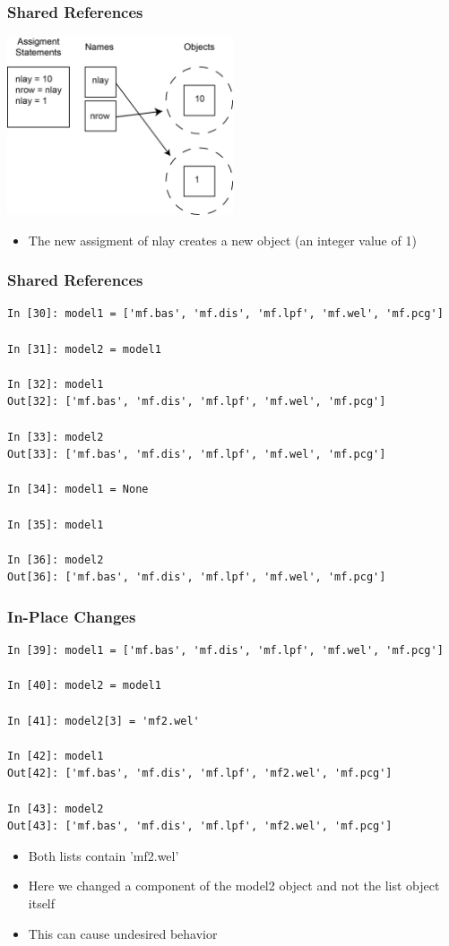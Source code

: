 \documentclass{beamer}
\begin{document}
\begin{frame}[fragile]
\frametitle{Shared References}
  \centering
    \includegraphics[width=0.5\textwidth]{figures/sharedref2.png} 
  \begin{itemize}
    \item{The new assigment of nlay creates a new object (an integer value of 1)}
  \end{itemize}
\end{frame}

\begin{frame}[fragile]
\frametitle{Shared References}
  \begin{lstlisting}
In [30]: model1 = ['mf.bas', 'mf.dis', 'mf.lpf', 'mf.wel', 'mf.pcg']

In [31]: model2 = model1

In [32]: model1
Out[32]: ['mf.bas', 'mf.dis', 'mf.lpf', 'mf.wel', 'mf.pcg']

In [33]: model2
Out[33]: ['mf.bas', 'mf.dis', 'mf.lpf', 'mf.wel', 'mf.pcg']

In [34]: model1 = None

In [35]: model1

In [36]: model2
Out[36]: ['mf.bas', 'mf.dis', 'mf.lpf', 'mf.wel', 'mf.pcg']
  \end{lstlisting}
\end{frame}

\begin{frame}[fragile]
\frametitle{In-Place Changes}
  \begin{lstlisting}
In [39]: model1 = ['mf.bas', 'mf.dis', 'mf.lpf', 'mf.wel', 'mf.pcg']

In [40]: model2 = model1

In [41]: model2[3] = 'mf2.wel'

In [42]: model1
Out[42]: ['mf.bas', 'mf.dis', 'mf.lpf', 'mf2.wel', 'mf.pcg']

In [43]: model2
Out[43]: ['mf.bas', 'mf.dis', 'mf.lpf', 'mf2.wel', 'mf.pcg']
  \end{lstlisting}
\begin{itemize}
  \item Both lists contain 'mf2.wel'
  \item Here we changed a component of the model2 object and not the list object itself
  \item This can cause undesired behavior
\end{itemize}
\end{frame}
\end{document}
